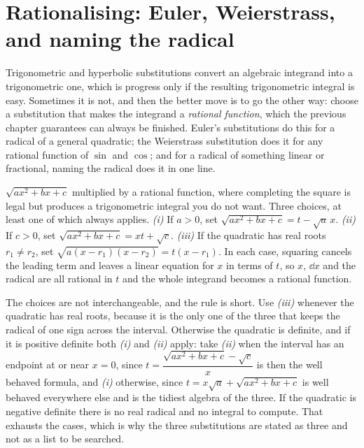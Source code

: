 \section{Rationalising: Euler, Weierstrass, and naming the radical}

Trigonometric and hyperbolic substitutions convert an algebraic integrand into a trigonometric one, which is progress only if the resulting trigonometric integral is easy. Sometimes it is not, and then the better move is to go the other way: choose a substitution that makes the integrand a \emph{rational function}, which the previous chapter guarantees can always be finished. Euler's substitutions do this for a radical of a general quadratic; the Weierstrass substitution does it for any rational function of $\sin$ and $\cos$; and for a radical of something linear or fractional, naming the radical does it in one line.

\cue $\sqrt{ax^2+bx+c}$ multiplied by a rational function, where completing the square is legal but produces a trigonometric integral you do not want.
\method Three choices, at least one of which always applies.
\emph{(i)} If $a>0$, set $\sqrt{ax^2+bx+c}=t-\sqrt a\,x$.
\emph{(ii)} If $c>0$, set $\sqrt{ax^2+bx+c}=xt+\sqrt c$.
\emph{(iii)} If the quadratic has real roots $r_1\neq r_2$, set $\sqrt{a(x-r_1)(x-r_2)}=t(x-r_1)$.
In each case, squaring cancels the leading term and leaves a linear equation for $x$ in terms of $t$, so $x$, $\dd x$ and the radical are all rational in $t$ and the whole integrand becomes a rational function.

\begin{keynote}
The choices are not interchangeable, and the rule is short. Use \emph{(iii)} whenever the quadratic has real roots, because it is the only one of the three that keeps the radical of one sign across the interval. Otherwise the quadratic is definite, and if it is positive definite both \emph{(i)} and \emph{(ii)} apply: take \emph{(ii)} when the interval has an endpoint at or near $x=0$, since $t=\dfrac{\sqrt{ax^2+bx+c}-\sqrt c}{x}$ is then the well behaved formula, and \emph{(i)} otherwise, since $t=x\sqrt a+\sqrt{ax^2+bx+c}$ is well behaved everywhere else and is the tidiest algebra of the three. If the quadratic is negative definite there is no real radical and no integral to compute. That exhausts the cases, which is why the three substitutions are stated as three and not as a list to be searched.
\end{keynote}

